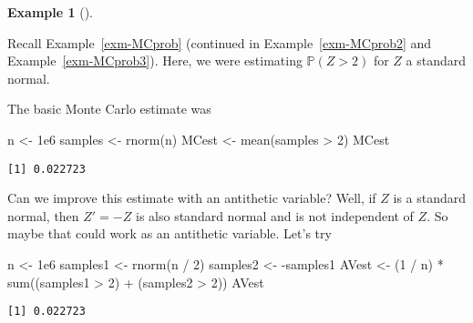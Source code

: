 \documentclass[
  letterpaper,
  DIV=11,
  numbers=noendperiod]{scrreprt}
\newenvironment{Shaded}{\begin{snugshade}}{\end{snugshade}}
\newcommand{\DecValTok}[1]{\textcolor[rgb]{0.68,0.00,0.00}{#1}}
\newcommand{\FloatTok}[1]{\textcolor[rgb]{0.68,0.00,0.00}{#1}}
\newcommand{\FunctionTok}[1]{\textcolor[rgb]{0.28,0.35,0.67}{#1}}
\newcommand{\NormalTok}[1]{\textcolor[rgb]{0.00,0.23,0.31}{#1}}
\newcommand{\OtherTok}[1]{\textcolor[rgb]{0.00,0.23,0.31}{#1}}
\newcommand{\SpecialCharTok}[1]{\textcolor[rgb]{0.37,0.37,0.37}{#1}}
\theoremstyle{plain}
\theoremstyle{definition}
\theoremstyle{definition}
\newtheorem{example}{Example}[chapter]
\theoremstyle{remark}
\begin{document}
\begin{example}[]\protect\hypertarget{exm-MCprob4}{}\label{exm-MCprob4}

Recall Example~\ref{exm-MCprob} (continued in Example~\ref{exm-MCprob2}
and Example~\ref{exm-MCprob3}). Here, we were estimating
\(\mathbb P(Z > 2)\) for \(Z\) a standard normal.

The basic Monte Carlo estimate was

\begin{Shaded}
\begin{Highlighting}[]
\NormalTok{n }\OtherTok{\textless{}{-}} \FloatTok{1e6}
\NormalTok{samples }\OtherTok{\textless{}{-}} \FunctionTok{rnorm}\NormalTok{(n)}
\NormalTok{MCest   }\OtherTok{\textless{}{-}} \FunctionTok{mean}\NormalTok{(samples }\SpecialCharTok{\textgreater{}} \DecValTok{2}\NormalTok{)}
\NormalTok{MCest}
\end{Highlighting}
\end{Shaded}

\begin{verbatim}
[1] 0.022723
\end{verbatim}

Can we improve this estimate with an antithetic variable? Well, if \(Z\)
is a standard normal, then \(Z' = -Z\) is also standard normal and is
not independent of \(Z\). So maybe that could work as an antithetic
variable. Let's try

\begin{Shaded}
\begin{Highlighting}[]
\NormalTok{n }\OtherTok{\textless{}{-}} \FloatTok{1e6}
\NormalTok{samples1 }\OtherTok{\textless{}{-}} \FunctionTok{rnorm}\NormalTok{(n }\SpecialCharTok{/} \DecValTok{2}\NormalTok{)}
\NormalTok{samples2 }\OtherTok{\textless{}{-}} \SpecialCharTok{{-}}\NormalTok{samples1}
\NormalTok{AVest }\OtherTok{\textless{}{-}}\NormalTok{ (}\DecValTok{1} \SpecialCharTok{/}\NormalTok{ n) }\SpecialCharTok{*} \FunctionTok{sum}\NormalTok{((samples1 }\SpecialCharTok{\textgreater{}} \DecValTok{2}\NormalTok{) }\SpecialCharTok{+}\NormalTok{ (samples2 }\SpecialCharTok{\textgreater{}} \DecValTok{2}\NormalTok{))}
\NormalTok{AVest}
\end{Highlighting}
\end{Shaded}

\begin{verbatim}
[1] 0.022723
\end{verbatim}

\end{example}
\end{document}
